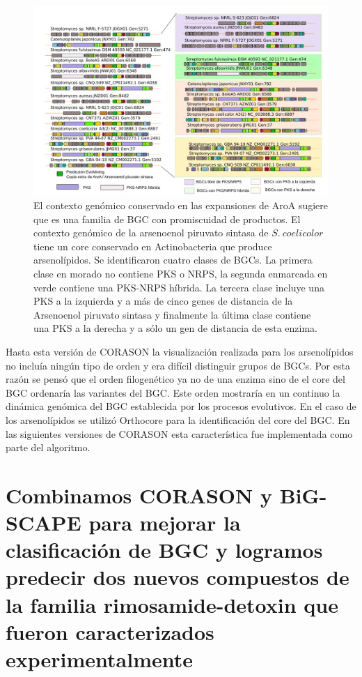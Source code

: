 \documentclass[12pt,twoside]{reedthesis}
\begin{document}
  \begin{figure}[h!tbp]
  \centering
  \includegraphics[angle = 0,scale = .4]{chapter3/Coelicolor.pdf}
  \caption[EvoMining Algorithm]{\footnotesize{El contexto genómico conservado en las expansiones de AroA sugiere que es una familia de BGC con promiscuidad de productos. El contexto genómico de la arsenoenol piruvato sintasa de $S.~coelicolor$ tiene un core conservado en Actinobacteria que produce arsenolípidos. Se identificaron cuatro clases de BGCs. La primera clase en morado no contiene PKS o NRPS, la segunda enmarcada en verde contiene una PKS-NRPS híbrida. La tercera clase incluye una PKS a la izquierda y a más de cinco genes de distancia de la Arsenoenol piruvato sintasa y finalmente la última clase contiene una PKS a la derecha y a sólo un gen de distancia de esta enzima.}}
  \label{fig:Coelicolor}
  \end{figure}
  
  Hasta esta versión de CORASON la visualización realizada para los
  arsenolípidos no incluía ningún tipo de orden y era difícil distinguir
  grupos de BGCs. Por esta razón se pensó que el orden filogenético ya no
  de una enzima sino de el core del BGC ordenaría las variantes del BGC.
  Este orden mostraría en un continuo la dinámica genómica del BGC
  establecida por los procesos evolutivos. En el caso de los arsenolípidos
  se utilizó Orthocore para la identificación del core del BGC. En las
  siguientes versiones de CORASON esta característica fue implementada
  como parte del algoritmo.
  
  \section{Combinamos CORASON y BiG-SCAPE para mejorar la clasificación de
  BGC y logramos predecir dos nuevos compuestos de la familia
  rimosamide-detoxin que fueron caracterizados
  experimentalmente}\label{combinamos-corason-y-big-scape-para-mejorar-la-clasificacion-de-bgc-y-logramos-predecir-dos-nuevos-compuestos-de-la-familia-rimosamide-detoxin-que-fueron-caracterizados-experimentalmente}
  
\end{document}
